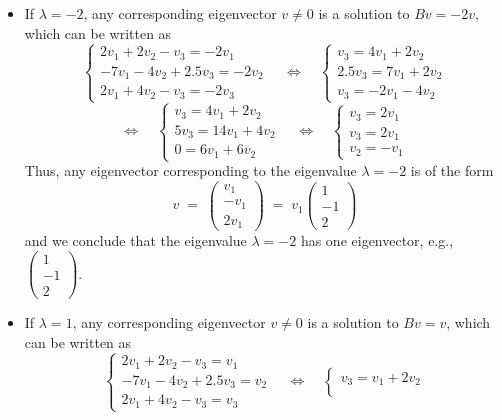 \begin{itemize}
\item If $\lambda = -2$, any corresponding eigenvector $v \neq 0$ is a solution to
$Bv = -2v$, which can be written as
\[
\begin{cases}
2v_1+2v_2-v_3 = -2v_1\\
-7v_1-4v_2+2.5v_3 = -2v_2\\
2v_1+4v_2-v_3 = -2v_3
\end{cases}
\quad\Longleftrightarrow\quad
\begin{cases}
v_3 = 4v_1+2v_2\\
2.5v_3 = 7v_1+2v_2\\
v_3 = -2v_1-4v_2
\end{cases}
\]
\[
\Longleftrightarrow\quad
\begin{cases}
v_3 = 4v_1+2v_2\\
5v_3 = 14v_1+4v_2\\
0 = 6v_1+6v_2
\end{cases}
\quad\Longleftrightarrow\quad
\begin{cases}
v_3 = 2v_1\\
v_3 = 2v_1\\
v_2 = -v_1
\end{cases}
\]
Thus, any eigenvector corresponding to the eigenvalue $\lambda = -2$ is of the form
\[
v \;=\; \begin{pmatrix}v_1\\ -v_1\\ 2v_1\end{pmatrix} \;=\;
v_1\begin{pmatrix}1\\-1\\2\end{pmatrix}
\]
and we conclude that the eigenvalue $\lambda = -2$ has one eigenvector, e.g.,
$\begin{pmatrix}1\\-1\\2\end{pmatrix}$.
\item If $\lambda = 1$, any corresponding eigenvector $v \neq 0$ is a solution to
$Bv = v$, which can be written as
\[
\begin{cases}
2v_1+2v_2-v_3 = v_1\\
-7v_1-4v_2+2.5v_3 = v_2\\
2v_1+4v_2-v_3 = v_3
\end{cases}
\quad\Longleftrightarrow\quad
\begin{cases}
v_3 = v_1+2v_2\\

\end{cases}\]
\end{itemize}
